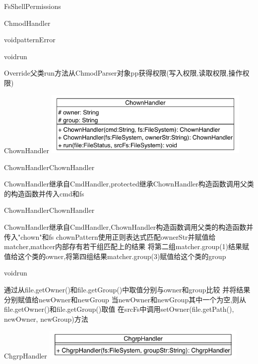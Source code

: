 \begin{XeClass}{FsShellPermissions}
\begin{XeInnerClass}{ChmodHandler}
\begin{XeMethod}{\XePrivate}{void}{patternError}
        \end{XeMethod}

        \begin{XeMethod}{\XePublic}{void}{run}
             
 Override父类run方法从ChmodParser对象pp获得权限(写入权限,读取权限,操作权限)

        \end{XeMethod}

    \end{XeInnerClass}
    \begin{XeInnerClass}{ChownHandler}
\includegraphics[width=10cm]{cdig/ChownHandler.png}
        
        \begin{XeMethod}{\XeProtected}{ChownHandler}{ChownHandler}
             
 ChownHandler继承自CmdHandler,protected继承ChownHandler构造函数调用父类的构造函数并传入cmd和fs

        \end{XeMethod}

        \begin{XeMethod}{}{ChownHandler}{ChownHandler}
             
 ChownHandler继承自CmdHandler,ChownHandler构造函数调用父类的构造函数并传入"chown"和fs
 chownPattern使用正则表达式匹配ownerStr并赋值给matcher,mathcer内部存有若干组匹配上的结果
 将第二组matcher.group(1)结果赋值给这个类的owner,将第四组结果matcher.group(3)赋值给这个类的group

        \end{XeMethod}

        \begin{XeMethod}{\XePublic}{void}{run}
             
 通过从file.getOwner()和file.getGroup()中取值分别与owner和group比较
 并将结果分别赋值给newOwner和newGroup
 当newOwner和newGroup其中一个为空,则从file.getOwner()和file.getGroup()取值
 在srcFs中调用setOwner(file.getPath(), newOwner, newGroup)方法

        \end{XeMethod}

    \end{XeInnerClass}
    \begin{XeInnerClass}{ChgrpHandler}
\includegraphics[width=10cm]{cdig/ChgrpHandler.png}
        

\end{XeInnerClass}
\end{XeClass}
